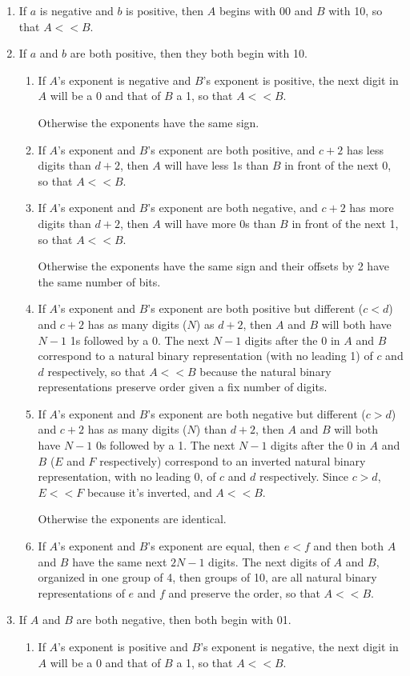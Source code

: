 \documentclass{acm_proc_article-sp}
\begin{document}
\begin{enumerate}
\item If $a$ is negative and $b$ is positive, then $A$ begins with 00 and $B$ with 10, so that $A << B$.
\item If $a$ and $b$ are both positive, then they both begin with 10.
\begin{enumerate}
  \item If $A$'s exponent is negative and $B$'s exponent is positive, the next digit in $A$ will be a 0 and that of $B$ a 1, so that $A << B$.

  Otherwise the exponents have the same sign.
  \item If $A$'s exponent and $B$'s exponent are both positive, and $c+2$ has less digits than $d+2$, then $A$ will have less 1s than $B$ in front of the next 0, so that $A << B$.
  \item If $A$'s exponent and $B$'s exponent are both negative, and $c+2$ has more digits than $d+2$, then $A$ will have more 0s than $B$ in front of the next 1, so that $A << B$.

  Otherwise the exponents have the same sign and their offsets by 2 have the same number of bits.
  \item If $A$'s exponent and $B$'s exponent are both positive but different ($c < d$) and $c+2$ has as many digits ($N$) as $d+2$, then $A$ and $B$ will both have $N-1$ 1s followed by a 0. The next $N-1$ digits after the 0 in $A$ and $B$ correspond to a natural binary representation (with no leading 1) of $c$ and $d$ respectively, so that $A << B$ because the natural binary representations preserve order given a fix number of digits.
  \item If $A$'s exponent and $B$'s exponent are both negative but different ($c > d$) and $c+2$ has as many digits ($N$) than $d+2$, then $A$ and $B$ will both have $N-1$ 0s followed by a 1. The next $N-1$ digits after the 0 in $A$ and $B$ ($E$ and $F$ respectively) correspond to an inverted natural binary representation, with no leading 0, of $c$ and $d$ respectively. Since $c > d$, $E << F$ because it's inverted, and $A << B$.

  Otherwise the exponents are identical.
  \item If $A$'s exponent and $B$'s exponent are equal, then $e < f$ and then both $A$ and $B$ have the same next $2N-1$ digits. The next digits of $A$ and $B$, organized in one group of 4, then groups of 10, are all natural binary representations of $e$ and $f$ and preserve the order, so that $A << B$.
  \end{enumerate}
\item If $A$ and $B$ are both negative, then both begin with 01.
  \begin{enumerate}
  \item If $A$'s exponent is positive and $B$'s exponent is negative, the next digit in $A$ will be a 0 and that of $B$ a 1, so that $A << B$.


\end{enumerate}
\end{enumerate}
\end{document}
